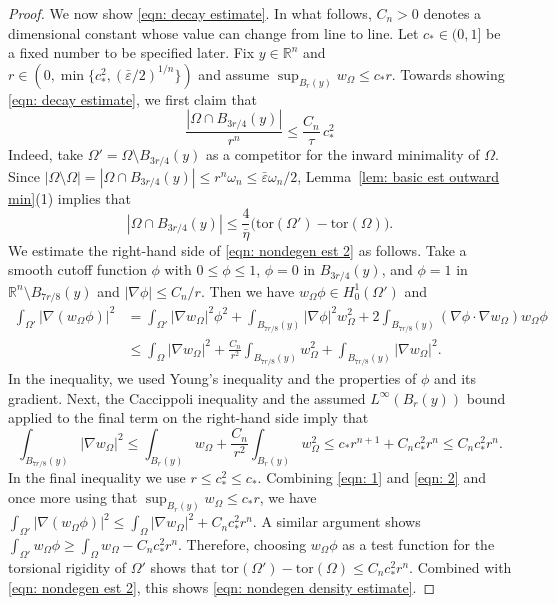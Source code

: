 \documentclass[10pt, reqno]{amsart}
\numberwithin{equation}{section}
\def\R{{\mathbb R}}
\def\e{\varepsilon}
\def\W{\Omega}
\def\om{\omega}
\def\tor{\mathrm{tor}}
\def\na{\nabla}
\def\baryEps{\bar{\e}}
\begin{document}
\begin{proof}
We now show \eqref{eqn: decay estimate}. In what follows,  $C_n>0$ denotes a dimensional constant whose value can change from line to line. 
Let $c_* \in (0,1]$ be a fixed number to be specified later.
	Fix $y \in \R^n$ and $r \in (0,\min\{c_*^2, (\baryEps /2)^{1/n}\})$ and assume $\sup_{{B_r(y)}}w_\W \leq c_* r$. Towards showing \eqref{eqn: decay estimate}, we first  claim that 
	\begin{equation}
\label{eqn: nondegen density estimate} 
\frac{| \W \cap B_{3r/4}(y)|}{r^n} \leq \frac{C_n}{\tau}\, c_*^2		
	\end{equation}
	Indeed, take $\W' = \W\setminus B_{3r/4}(y)$ as a competitor for the inward minimality of $\W$. 
Since $|\W \setminus \W| =|\W \cap B_{3r/4}(y)| \leq r^n \om_n  \leq \baryEps \om_n/2$, Lemma~\ref{lem: basic est outward min}(1) implies that 
\begin{equation}
	\label{eqn: nondegen est 2}
 |\W \cap B_{3r/4}(y)| \leq \frac{4}{\bar\eta}\big(\tor(\W') - \tor(\W)\big).
\end{equation}
We estimate the right-hand side of \eqref{eqn: nondegen est 2} as follows. Take a smooth cutoff function $\phi$ with $0 \leq \phi \leq 1$, $\phi =0$ in $B_{3r/4}(y)$, and $\phi =1$ in $\mathbb{R}^n \setminus B_{7r/8}(y)$ and $|\nabla \phi | \leq C_n/r$. Then we have $w_\W \phi \in H^1_0(\W')$ and 
\begin{equation}\label{eqn: 1}
\begin{split}
\int_{\W'} |\na (w_\W \phi) |^2 &= \int_{\W'} |\na w_\W|^2\phi^2 + \int_{B_{7r/8}(y)}  |\nabla\phi |^2 w_\W^2 + 2 \int_{B_{7r/8}(y)} (\nabla\phi \cdot \nabla w_\W )w_\W \phi \\
& \leq \int_{\W}  |\na w_\W|^2 + \frac{C_n}{r^2} \int_{B_{7r/8}(y)} w_\W^2  +  \int_{B_{7r/8}(y)} | \nabla w_\W|^2.
\end{split}
\end{equation}
In the inequality, we used  Young's inequality and the properties of $\phi$ and its gradient. Next, the Caccippoli inequality and the assumed $L^\infty(B_r(y))$ bound applied to the final term on the right-hand side imply that 
\begin{equation}
    \label{eqn: 2}
\int_{B_{7r/8}(y)} |\na w_{\W}|^2 \leq \int_{B_r(y)}  w_{\W} +  \frac{C_n}{r^2} \int_{B_r(y)} w_\W^2 \leq  c_* r^{n+1}  + C_n c_*^2  r^n \leq C_n c_*^2 r^n.
\end{equation}
In the final inequality we use $r \leq c_*^2 \leq c_*$. Combining  \eqref{eqn: 1} and \eqref{eqn: 2} and once more using that  $\sup_{{B_r(y)}}w_\W \leq c_* r$, we have
$\int_{\W'} |\na (w_\W \phi) |^2 \leq \int_{\W}  |\na w_\W|^2 + C_n  c_*^2 r^{n}.
$
A similar argument shows $\int_{\W'} w_\W \phi \geq \int_{\W} w_\W - C_n c_*^2 r^{n}$. Therefore, choosing $w_\W \phi$ as a test function for the torsional rigidity of $\W'$ shows that 
$\tor(\W') -\tor(\W)\leq C_n c_*^2 r^{n}.$
Combined with \eqref{eqn: nondegen est 2}, this shows \eqref{eqn: nondegen density estimate}.


\end{proof}
\end{document}
